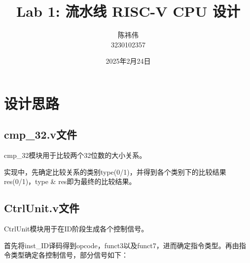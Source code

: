 \documentclass{article}
\author{陈祎伟\\3230102357}
\title{Lab 1: 流水线 RISC-V CPU 设计}
\date{2025年2月24日}
\begin{document}
\maketitle
\section{设计思路}
\subsection{cmp\_32.v文件}
cmp\_32模块用于比较两个32位数的大小关系。\par
实现中，先确定比较关系的类别type(0/1)，并得到各个类别下的比较结果res(0/1)，type \& res即为最终的比较结果。\par

\subsection{CtrlUnit.v文件}
CtrlUnit模块用于在ID阶段生成各个控制信号。\par
首先将inst\_ID译码得到opcode，funct3以及funct7，进而确定指令类型。再由指令类型确定各控制信号，部分信号如下：\par
\end{document}
